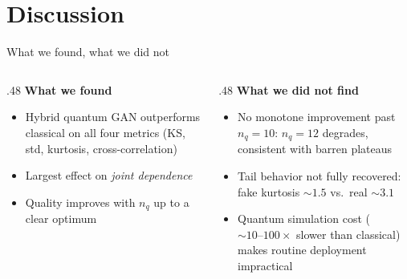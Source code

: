 
\section{Discussion}
\label{sec:discussion}
\frame[plain]{\sectionpage}

\begin{frame}{What we found, what we did not}
    \begin{columns}[T]
    \begin{column}{.48\textwidth}
        \textbf{What we found}
        \begin{itemize}
            \item Hybrid quantum GAN outperforms classical
            on all four metrics (KS, std, kurtosis,
            cross-correlation)
            \item Largest effect on \emph{joint dependence}
            \item Quality improves with $n_q$ up to a clear
            optimum %
        \end{itemize}
    \end{column}
    \hfill
    \begin{column}{.48\textwidth}
        \textbf{What we did not find}
        \begin{itemize}
            \item No monotone improvement past $n_q\!=\!10$:
            $n_q\!=\!12$ degrades, consistent with barren
            plateaus
            \item Tail behavior not fully recovered:
            fake kurtosis $\sim\!1.5$ vs.\ real $\sim\!3.1$%
            \item Quantum simulation cost
            ($\sim\!10\text{--}100\!\times$ slower than
            classical) makes routine deployment impractical
        \end{itemize}
    \end{column}
    \end{columns}
    \medskip

\end{frame}

